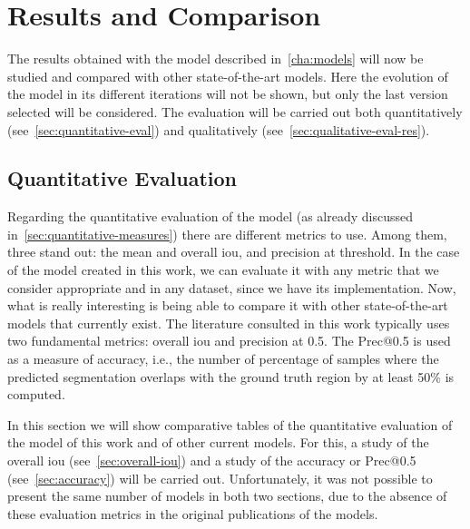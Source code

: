 

\chapter{Results and Comparison}\label{cha:results}



The results obtained with the model described in\ \vref{cha:models} will now be
studied and compared with other state-of-the-art models. Here the evolution of
the model in its different iterations will not be shown, but only the last
version selected will be considered. The evaluation will be carried out both
quantitatively (see\ \vref{sec:quantitative-eval}) and qualitatively (see\
\vref{sec:qualitative-eval-res}).



\section{Quantitative Evaluation}\label{sec:quantitative-eval}

Regarding the quantitative evaluation of the model (as already discussed in\
\vref{sec:quantitative-measures}) there are different metrics to use. Among
them, three stand out: the mean and overall \gls{iou}, and precision at
threshold. In the case of the model created in this work, we can evaluate it
with any metric that we consider appropriate and in any dataset, since we have
its implementation. Now, what is really interesting is being able to compare it
with other state-of-the-art models that currently exist. The literature
consulted in this work typically uses two fundamental metrics: overall
\gls{iou} and precision at 0.5. The Prec@0.5 is used as a measure of accuracy,
i.e., the number of percentage of samples where the predicted segmentation
overlaps with the ground truth region by at least 50\% is computed.

In this section we will show comparative tables of the quantitative evaluation
of the model of this work and of other current models. For this, a study of the
overall \gls{iou} (see\ \vref{sec:overall-iou}) and a study of the accuracy or
Prec@0.5 (see\ \vref{sec:accuracy}) will be carried out. Unfortunately, it was
not possible to present the same number of models in both two sections, due to
the absence of these evaluation metrics in the original publications of the
models.


